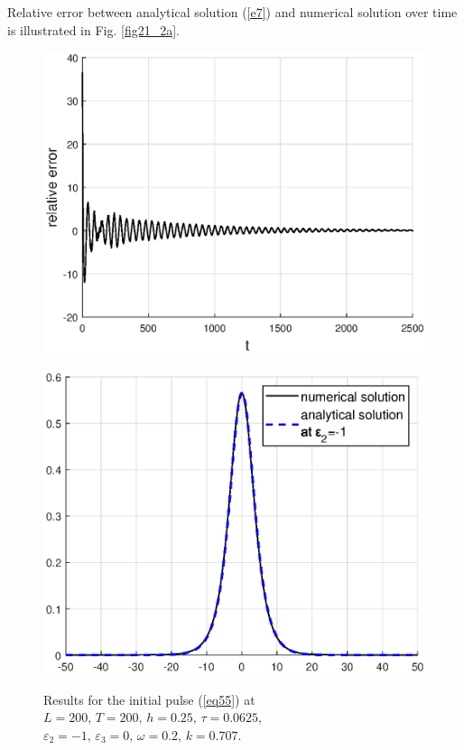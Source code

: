\documentclass[preprint,12pt]{elsarticle}
\begin{document}
Relative error between analytical solution (\ref{e7}) and numerical solution over time is illustrated in Fig. \ref{fig21_2a}. 
\begin{figure}[H]
\begin{center}
\begin{minipage}[h]{0.48\linewidth}
\includegraphics[width=1\linewidth]{fig48.eps}
\label{fig21_2a}
\end{minipage}
\hfill
\begin{minipage}[h]{0.48\linewidth}
\includegraphics[width=1\linewidth]{fig49.eps}
\label{fig21_2b}
\end{minipage}
\end{center}
\caption{Results for the initial pulse (\ref{eq55}) at
\(L=200,\, T=200,\, h=0.25,\, \tau=0.0625,\)
\(\varepsilon_{2}=-1,\,\varepsilon_{3}=0,\, \omega=0.2,\, k=0.707\).}
\label{fig21_2}
\end{figure}
\end{document}
